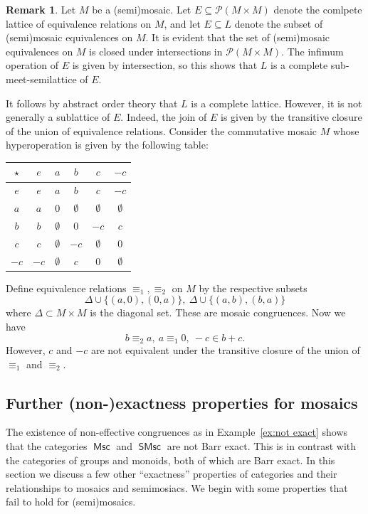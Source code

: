 \documentclass[reqno]{amsart}
\newcommand{\cat}[1]{\ensuremath{\mathsf{#1}}}
\DeclareMathOperator{\Msc}{\cat{Msc}}
\DeclareMathOperator{\SMsc}{\cat{SMsc}}
\renewcommand{\P}{\mathcal{P}}
\numberwithin{equation}{section}
\theoremstyle{plain}
\theoremstyle{definition}
\newtheorem{remark}[equation]{Remark}
\begin{document}
\begin{remark}\label{rem:completeness}
Let $M$ be a (semi)mosaic. Let $E \subseteq \P(M \times M)$ denote the comlpete lattice of equivalence relations on $M$, and let $E \subseteq L$ denote the subset of (semi)mosaic equivalences on $M$.
It is evident that the set of (semi)mosaic equivalences on $M$ is closed under intersections in $\P(M \times M)$. The infimum operation of $E$ is given by intersection, so this shows that $L$ is a complete sub-meet-semilattice of $E$.

It follows by abstract order theory that $L$ is a complete lattice. However, it is not generally a sublattice of $E$. Indeed, the join of $E$ is given by the transitive closure of the union of equivalence relations.
Consider the commutative mosaic $M$ whose hyperoperation is given by the following table:
\begin{center}
\begin{tabular}{ |c|c|c|c|c|c| } 
\hline
$\star$ & $e$ & $a$ & $b$ & $c$ & $-c$ \\
\hline
$e$ & $e$ & $a$ & $b$ & $c$ & $-c$ \\ 
\hline
$a$ & $a$ & $0$ & $\emptyset$
& $\emptyset$ & $\emptyset$\\ 
\hline
$b$ & $b$ & $\emptyset$ & $0$
& $-c$ & $c$\\ 
\hline
$c$ & $c$ & $\emptyset$ & $-c$
& $\emptyset$ & $0$\\ 
\hline
$-c$ & $-c$ & $\emptyset$ & $c$
& $0$ & $\emptyset$\\ 
\hline
\end{tabular}
\end{center} 
Define equivalence relations $\equiv_1, \equiv_2$ on $M$ by the respective subsets
$$\Delta\cup\{(a, 0), (0, a)\},\ \Delta\cup\{(a, b), (b, a)\}$$
where $\Delta\subset M\times M$ is the diagonal set. These are mosaic congruences. Now we have 
$$b\equiv_2 a,\ a\equiv_1 0,\ -c\in b+c.$$
However, $c$ and $-c$ are not equivalent under the transitive closure of the union of $\equiv_1$ and $\equiv_2$.
\end{remark}

\subsection{Further (non-)exactness properties for mosaics}
\label{sub:exact}

The existence of non-effective congruences as in Example~\ref{ex:not exact} shows that the categories $\Msc$ and $\SMsc$ are not Barr exact. This is in contrast with the categories of groups and monoids, both of which are Barr exact.
In this section we discuss a few other ``exactness'' properties of categories and their relationships to mosaics and semimosiacs.
We begin with some properties that fail to hold for (semi)mosaics.
\end{document}
